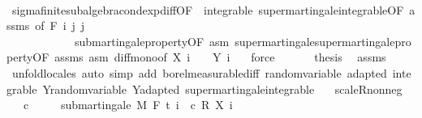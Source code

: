 \begin{isabellebody}
\ \ \ \ \ \ \isamarkupfalse%
\ sigma{\isacharunderscore}{\kern0pt}finite{\isacharunderscore}{\kern0pt}subalgebra{\isachardot}{\kern0pt}cond{\isacharunderscore}{\kern0pt}exp{\isacharunderscore}{\kern0pt}diff{\isacharbrackleft}{\kern0pt}OF\ {\isacharunderscore}{\kern0pt}\ integrable\ supermartingale{\isachardot}{\kern0pt}integrable{\isacharbrackleft}{\kern0pt}OF\ assms{\isacharbrackright}{\kern0pt}{\isacharcomma}{\kern0pt}\ of\ {\isachardoublequoteopen}F\ i{\isachardoublequoteclose}\ j\ j{\isacharbrackright}{\kern0pt}\ \isanewline
\ \ \ \ \ \ \ \ \ \ \ \ submartingale{\isacharunderscore}{\kern0pt}property{\isacharbrackleft}{\kern0pt}OF\ asm{\isacharbrackright}{\kern0pt}\ supermartingale{\isachardot}{\kern0pt}supermartingale{\isacharunderscore}{\kern0pt}property{\isacharbrackleft}{\kern0pt}OF\ assms\ asm{\isacharbrackright}{\kern0pt}\ diff{\isacharunderscore}{\kern0pt}mono{\isacharbrackleft}{\kern0pt}of\ {\isachardoublequoteopen}X\ i\ {\isacharunderscore}{\kern0pt}{\isachardoublequoteclose}\ {\isacharunderscore}{\kern0pt}\ {\isacharunderscore}{\kern0pt}\ {\isachardoublequoteopen}Y\ i\ {\isacharunderscore}{\kern0pt}{\isachardoublequoteclose}{\isacharbrackright}{\kern0pt}\ \isamarkupfalse%
\ force\isanewline
\ \ \isacommand{{\isacharbraceright}{\kern0pt}}\isamarkupfalse%
\isanewline
\ \ \isamarkupfalse%
\ {\isacharquery}{\kern0pt}thesis\ \isamarkupfalse%
\ assms\ \isamarkupfalse%
\ {\isacharparenleft}{\kern0pt}unfold{\isacharunderscore}{\kern0pt}locales{\isacharparenright}{\kern0pt}\ {\isacharparenleft}{\kern0pt}auto\ simp\ add{\isacharcolon}{\kern0pt}\ borel{\isacharunderscore}{\kern0pt}measurable{\isacharunderscore}{\kern0pt}diff\ random{\isacharunderscore}{\kern0pt}variable\ adapted\ integrable\ Y{\isachardot}{\kern0pt}random{\isacharunderscore}{\kern0pt}variable\ Y{\isachardot}{\kern0pt}adapted\ supermartingale{\isachardot}{\kern0pt}integrable{\isacharparenright}{\kern0pt}\ \ \isanewline
{}\isamarkupfalse%
%
\endisatagproof
{\isafoldproof}%
%
\isadelimproof
\isanewline
%
\endisadelimproof
\isanewline
{}\isamarkupfalse%
\ scaleR{\isacharunderscore}{\kern0pt}nonneg{\isacharcolon}{\kern0pt}\ \isanewline
\ \ \ {\isachardoublequoteopen}c\ {\isasymge}\ {}{\isachardoublequoteclose}\isanewline
\ \ \ {\isachardoublequoteopen}submartingale\ M\ F\ t\ {\isacharparenleft}{\kern0pt}{\isasymlambda}i\ {\isasymxi}{\isachardot}{\kern0pt}\ c\ {\isacharasterisk}{\kern0pt}\isactrlsub R\ X\ i\ {\isasymxi}{\isacharparenright}{\kern0pt}{\isachardoublequoteclose}\isanewline

\end{isabellebody}
